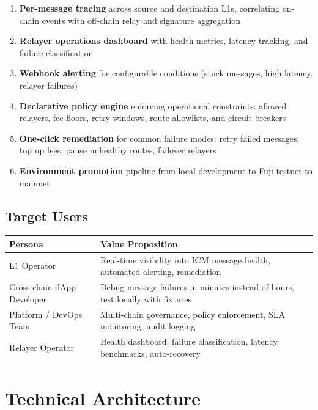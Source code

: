 \documentclass[11pt,a4paper]{article}
\begin{document}
\begin{enumerate}[label=\textcolor{avaxred}{\arabic*.}]
  \item \textbf{Per-message tracing} across source and destination L1s, correlating on-chain events with off-chain relay and signature aggregation
  \item \textbf{Relayer operations dashboard} with health metrics, latency tracking, and failure classification
  \item \textbf{Webhook alerting} for configurable conditions (stuck messages, high latency, relayer failures)
  \item \textbf{Declarative policy engine} enforcing operational constraints: allowed relayers, fee floors, retry windows, route allowlists, and circuit breakers
  \item \textbf{One-click remediation} for common failure modes: retry failed messages, top up fees, pause unhealthy routes, failover relayers
  \item \textbf{Environment promotion} pipeline from local development to Fuji testnet to mainnet
\end{enumerate}

\subsection{Target Users}

\begin{table}[h]
\centering
\small
\begin{tabularx}{\textwidth}{@{}l L{10cm}@{}}
\toprule
\textbf{Persona} & \textbf{Value Proposition} \\
\midrule
L1 Operator & Real-time visibility into ICM message health, automated alerting, remediation \\
Cross-chain dApp Developer & Debug message failures in minutes instead of hours, test locally with fixtures \\
Platform / DevOps Team & Multi-chain governance, policy enforcement, SLA monitoring, audit logging \\
Relayer Operator & Health dashboard, failure classification, latency benchmarks, auto-recovery \\
\bottomrule
\end{tabularx}
\end{table}

\section{Technical Architecture}
\end{document}
